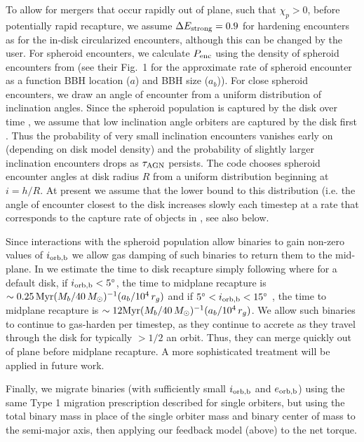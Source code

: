To allow for mergers that occur rapidly out of plane, such that $\chi_{p}>0$, before potentially rapid recapture, we assume $\Delta E_{\rm strong}=0.9$ for hardening encounters as for the in-disk circularized encounters, although this can be changed by the user.
For spheroid encounters, we calculate $P_{\rm enc}$ using the density of spheroid encounters from \citet{Leigh+18} (see their Fig.~1 for the approximate rate of spheroid encounter as a function BBH location ($a$) and BBH size ($a_{b}$)).
For close spheroid encounters, we draw an angle of encounter from a uniform distribution of inclination angles.
Since the spheroid population is captured by the disk over time \citep[e.g.][]{Rowan+25}, we assume that low inclination angle orbiters are captured by the disk first \citep{Whitehead+25b}.
Thus the probability of very small inclination encounters vanishes early on (depending on disk model density) and the probability of slightly larger inclination encounters drops as $\tau_{\rm AGN}$ persists.
The code chooses spheroid encounter angles at disk radius $R$ from a uniform distribution beginning at $i=h/R$.
At present we assume that the lower bound to this distribution (i.e. the angle of encounter closest to the disk increases slowly each timestep at a rate that corresponds to the capture rate of objects in \citep{Fabj+20}, see also below.

Since interactions with the spheroid population allow binaries to gain non-zero values of $i_{\rm orb,b}$ we allow gas damping of such binaries to return them to the mid-plane.
In  we estimate the time to disk recapture simply following \citet{Fabj+20} where for a default \citet{SirkoGoodman03} disk, if $i_{\rm orb,b}<5^{\circ}$, the time to midplane recapture is $\sim 0.25 \,{\rm Myr} (M_{b}/40\,M_{\odot})^{-1}(a_{b}/10^{4}\,r_{g})$ and if $5^{\circ}<i_{\rm orb,b}<15^{\circ}$ , the time to midplane recapture is $\sim 12{\rm Myr}(M_{b}/40\,M_{\odot})^{-1}(a_{b}/10^{4}\,r_{g})$.
We allow such binaries to continue to gas-harden per timestep, as they continue to accrete as they travel through the disk for typically $>1/2$ an orbit.
Thus, they can merge quickly out of plane before midplane recapture.
A more sophisticated treatment will be applied in future work. 

Finally, we migrate binaries (with sufficiently small $i_{\rm orb,b}$ and $e_{\rm orb,b }$) using the same Type 1 migration prescription described for single orbiters, but using the total binary mass in place of the single orbiter mass and binary center of mass to the semi-major axis, then applying our feedback model (above) to the net torque.

